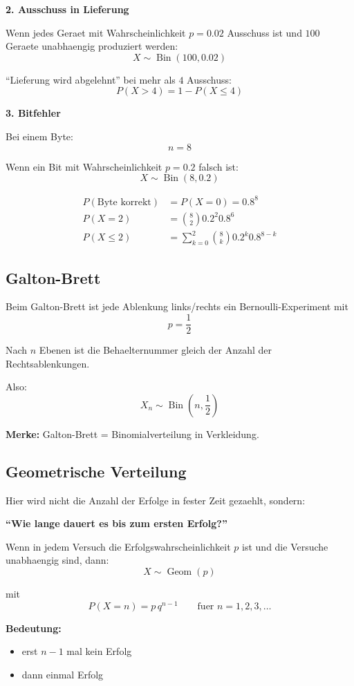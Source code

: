 \documentclass[a4paper,11pt]{article}
\begin{document}
\textbf{2. Ausschuss in Lieferung}

Wenn jedes Geraet mit Wahrscheinlichkeit $p=0.02$ Ausschuss ist und $100$ Geraete unabhaengig produziert werden:
\[
X \sim \operatorname{Bin}(100,0.02)
\]

``Lieferung wird abgelehnt'' bei mehr als $4$ Ausschuss:
\[
P(X>4)=1-P(X\le 4)
\]

\textbf{3. Bitfehler}

Bei einem Byte:
\[
n=8
\]

Wenn ein Bit mit Wahrscheinlichkeit $p=0.2$ falsch ist:
\[
X \sim \operatorname{Bin}(8,0.2)
\]

\begin{align*}
P(\text{Byte korrekt}) &= P(X=0)=0.8^8 \\
P(X=2) &= \binom82 0.2^2 0.8^6 \\
P(X\le 2) &= \sum_{k=0}^2 \binom8k 0.2^k 0.8^{8-k}
\end{align*}

\subsection{Galton-Brett}
Beim Galton-Brett ist jede Ablenkung links/rechts ein Bernoulli-Experiment mit
\[
p=\frac12
\]

Nach $n$ Ebenen ist die Behaelternummer gleich der Anzahl der Rechtsablenkungen.

Also:
\[
X_n \sim \operatorname{Bin}\left(n,\frac12\right)
\]

\textbf{Merke:}
Galton-Brett = Binomialverteilung in Verkleidung.

\subsection{Geometrische Verteilung}
Hier wird nicht die Anzahl der Erfolge in fester Zeit gezaehlt, sondern:

\textbf{``Wie lange dauert es bis zum ersten Erfolg?''}

Wenn in jedem Versuch die Erfolgswahrscheinlichkeit $p$ ist und die Versuche unabhaengig sind, dann:
\[
X \sim \operatorname{Geom}(p)
\]

mit
\[
P(X=n)=p\,q^{n-1}
\qquad \text{fuer } n=1,2,3,\dots
\]

\textbf{Bedeutung:}
\begin{itemize}
  \item erst $n-1$ mal kein Erfolg
  \item dann einmal Erfolg
\end{itemize}
\end{document}
